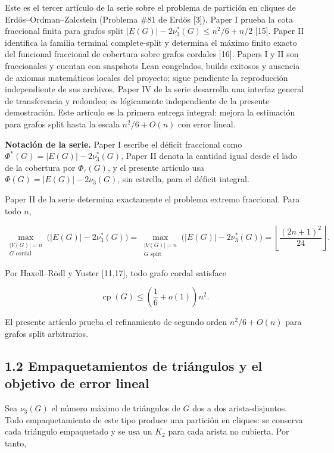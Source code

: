 \documentclass[
  spanish,
  11pt,
  a4paper,
]{article}
\begin{document}
Este es el tercer artículo de la serie sobre el problema de partición en cliques de Erdős--Ordman--Zalcstein (Problema \#81 de Erdős {[}3{]}). Paper I prueba la cota fraccional finita para grafos split \(|E(G)|-2\nu_3^*(G)\le n^2/6+n/2\) {[}15{]}. Paper II identifica la familia terminal complete-split y determina el máximo finito exacto del funcional fraccional de cobertura sobre grafos cordales {[}16{]}. Papers I y II son fraccionales y cuentan con snapshots Lean congelados, builds exitosos y ausencia de axiomas matemáticos locales del proyecto; sigue pendiente la reproducción independiente de sus archivos. Paper IV de la serie desarrolla una interfaz general de transferencia y redondeo; es lógicamente independiente de la presente demostración. Este artículo es la primera entrega integral: mejora la estimación para grafos split hasta la escala \(n^2/6+O(n)\) con error lineal.

\textbf{Notación de la serie.} Paper I escribe el déficit fraccional como \(\Phi^*(G)=|E(G)|-2\nu_3^*(G)\), Paper II denota la cantidad igual desde el lado de la cobertura por \(\Phi_\tau(G)\), y el presente artículo usa \(\Phi(G)=|E(G)|-2\nu_3(G)\), sin estrella, para el déficit integral.

Paper II de la serie determina exactamente el problema extremo fraccional. Para todo \(n\),

\[
\max_{\substack{|V(G)|=n\\G\text{ cordal}}}
\bigl(|E(G)|-2\nu_3^*(G)\bigr)
=
\max_{\substack{|V(G)|=n\\G\text{ split}}}
\bigl(|E(G)|-2\nu_3^*(G)\bigr)
=
\left\lfloor\frac{(2n+1)^2}{24}\right\rfloor.
\]

Por Haxell--Rödl y Yuster {[}11,17{]}, todo grafo cordal satisface

\[
\operatorname{cp}(G)
\le
\left(\frac16+o(1)\right)n^2.
\]

El presente artículo prueba el refinamiento de segundo orden \(n^2/6+O(n)\) para grafos split arbitrarios.

\subsection{1.2 Empaquetamientos de triángulos y el objetivo de error lineal}\label{empaquetamientos-de-triuxe1ngulos-y-el-objetivo-de-error-lineal}

Sea \(\nu_3(G)\) el número máximo de triángulos de \(G\) dos a dos arista-disjuntos. Todo empaquetamiento de este tipo produce una partición en cliques: se conserva cada triángulo empaquetado y se usa un \(K_2\) para cada arista no cubierta. Por tanto,
\end{document}
